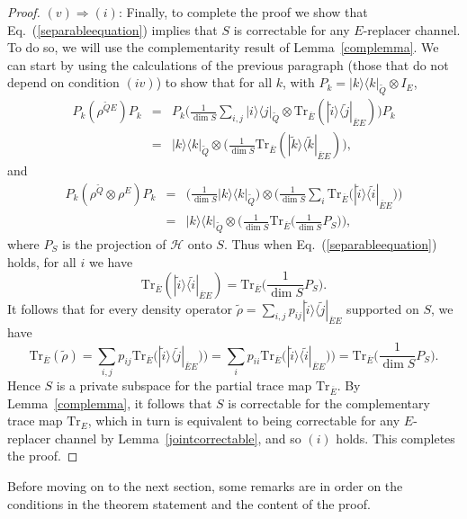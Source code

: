 \documentclass[11pt]{amsart}
\theoremstyle{definition}
\theoremstyle{definition}
\theoremstyle{definition}
\newcommand{\tr}{\textrm{Tr}}
\newcommand{\1}{\mathbb{I}}
\newcommand{\T}[1]{\widetilde{#1}} %
\def\kb#1#2{|#1\rangle\!\langle #2 |}
\begin{document}
\begin{proof}
$(v)\Rightarrow (i)$: Finally, to complete the proof we show that Eq.~(\ref{separableequation}) implies that $S$ is correctable for any $E$-replacer channel. To do so, we will use the complementarity result of Lemma~\ref{complemma}. We can start by using the calculations of the previous paragraph (those that do not depend on condition $(iv)$) to show that for all $k$, with $P_{k} = \kb{k}{k}_{\T{Q}} \otimes I_E$, 
\begin{eqnarray*} 
P_{k} (\rho^{\T{Q}E}) P_{k} &=& P_{k} \Big( \frac{1}{\dim S} \sum_{i,j} \kb{i}{j}_{\T{Q}} \otimes \tr_{\overline{E}} ( \kb{\widetilde{i}}{\widetilde{j}}_{\overline{E}E} )   \Big) P_{k} \\
&=&  \kb{k}{k}_{\T{Q}} \otimes\Big( \frac{1}{\dim S} \tr_{\overline{E}} ( \kb{\widetilde{k}}{\widetilde{k}}_{\overline{E}E} ) \Big)  , 
\end{eqnarray*} 
and 
\begin{eqnarray*}
P_k ( \rho^{\T{Q}} \otimes \rho^E ) P_k &=& \Big( \frac{1}{\dim S} \kb{k}{k}_{\T{Q}} \Big) \otimes \Big( \frac{1}{\dim S} \sum_i \tr_{\overline{E}} \big( \kb{\widetilde{i}}{\widetilde{i}}_{\overline{E}E} \big)  \Big) \\ &=&   
\kb{k}{k}_{\T{Q}} \otimes \Big( \frac{1}{\dim S} \tr_{\overline{E}} \big(\frac{1}{\dim S} P_S \big) \Big), 
\end{eqnarray*}
where $P_S$ is the projection of $\mathcal H$ onto $S$. Thus when Eq.~(\ref{separableequation}) holds, for all $i$ we have  
\[
\tr_{\overline{E}} ( \kb{\widetilde{i}}{\widetilde{i}}_{\overline{E}E} ) = \tr_{\overline{E}} \big(\frac{1}{\dim S} P_S \big). 
\]
It follows that for every density operator $\widetilde{\rho} = \sum_{i,j} p_{ij} \kb{\widetilde{i}}{\widetilde{j}}_{\overline{E}E}$ supported on $S$, we have 
\[
\tr_{\overline{E}} ( \widetilde{\rho}  ) = \sum_{i,j} p_{ij} \tr_{\overline{E}} \big( \kb{\widetilde{i}}{\widetilde{j}}_{\overline{E}E} )  \big) = \sum_{i} p_{ii} \tr_{\overline{E}} \big( \kb{\widetilde{i}}{\widetilde{i}}_{\overline{E}E} )  \big) = \tr_{\overline{E}} \big(\frac{1}{\dim S} P_S \big). 
\]
Hence $S$ is a private subspace for the partial trace map $\tr_{\overline{E}}$. By Lemma~\ref{complemma}, it follows that $S$ is correctable for the complementary trace map $\tr_{E}$, which in turn is equivalent to being correctable for any $E$-replacer channel by Lemma~\ref{jointcorrectable}, and so $(i)$ holds. This completes the proof. 
\end{proof}

Before moving on to the next section, some remarks are in order on the conditions in the theorem statement and the content of the proof. 
\end{document}
